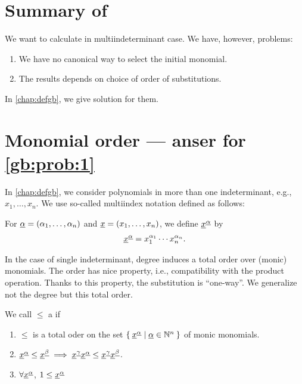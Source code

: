 \section{Summary of }
We want to calculate in multiindeterminant case.
We have, however, problems:
\begin{enumerate}
\item
\label{gb:prob:1}
  We have no canonical way to select the initial monomial.
\item
\label{gb:prob:2}
  The results depends on choice of order of substitutions.
\end{enumerate}
In \cref{chap:defgb},
we give solution for them.


\section{Monomial order --- anser for \cref{gb:prob:1}}
In \cref{chap:defgb},
we consider polynomials in more than one indeterminant,
e.g., $x_1,\ldots,x_n$.
We use so-called multiindex notation defined as follows:
\begin{definition}
  For ${\underline{\alpha}}=(\alpha_1,\ldots,\alpha_n)$
  and ${\underline{x}}=(x_1,\ldots,x_n)$,
  we define ${\underline{x}}^{{\underline{\alpha}}}$ by
  \begin{align*}
    {\underline{x}}^{{\underline{\alpha}}}=
    x_1^{\alpha_1}\cdots x_n^{\alpha_n}.
  \end{align*}
\end{definition}


In the case of single indeterminant,
degree induces a total order over (monic) monomials.
The order has nice property,
i.e., compatibility with the product operation.
Thanks to this property,
the substitution is ``one-way''.
We generalize not the degree but this total order.

\begin{definition}
  We call $\leq$ a 
  if
  \begin{enumerate}
  \item $\leq$ is  a total oder on the set $\Set{{\underline{x}}^{\underline{\alpha}}|{\underline{\alpha}}\in\mathbb{N}^n}$ of monic monomials.
  \item ${\underline{x}}^{\underline{\alpha}}\leq {\underline{x}}^{\underline{\beta}} \implies {\underline{x}}^{\underline{\gamma}}{\underline{x}}^{\underline{\alpha}}\leq {\underline{x}}^{\underline{\gamma}}{\underline{x}}^{\underline{\beta}} $.
  \item $\forall {\underline{x}}^{\underline{\alpha}}$, $1\leq {\underline{x}}^{\underline{\alpha}}$
  \end{enumerate}
\end{definition}

